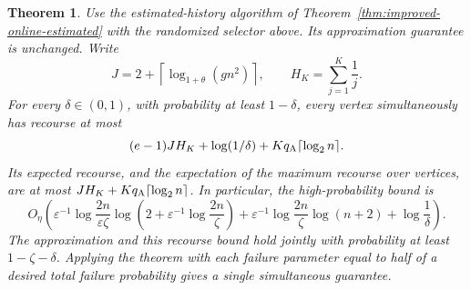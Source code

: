 \documentclass[11pt]{article}
\newtheorem{theorem}{Theorem}[section]
\begin{document}
\begin{theorem}\label{thm:improved-random-recourse}
Use the estimated-history algorithm of
Theorem~\ref{thm:improved-online-estimated} with the randomized selector
above. Its approximation guarantee is unchanged. Write
\[
 J=2+\left\lceil\log_{1+\theta}(gn^2)\right\rceil,
 \qquad H_K=\sum_{j=1}^K\frac1j.
\]
For every $\delta\in(0,1)$, with probability at least $1-\delta$,
every vertex simultaneously has recourse at most
\[
 (e-1)JH_K+\log(1/\delta)
       +Kq_{\rm A}\lceil\log_2n\rceil.
\]
Its expected recourse, and the expectation of the maximum recourse over
vertices, are at most
$JH_K+Kq_{\rm A}\lceil\log_2n\rceil$.
In particular, the high-probability bound is
\[
 O_\eta\!\left(
  \varepsilon^{-1}\log\frac{2n}{\varepsilon\zeta}
       \log\left(2+\varepsilon^{-1}\log\frac{2n}{\zeta}\right)
 +\varepsilon^{-1}\log\frac{2n}{\zeta}\log(n+2)
 +\log\frac1\delta
 \right).
\]
The approximation and this recourse bound hold jointly with probability
at least $1-\zeta-\delta$. Applying the theorem with each failure
parameter equal to half of a desired total failure probability gives a
single simultaneous guarantee.
\end{theorem}
\end{document}
